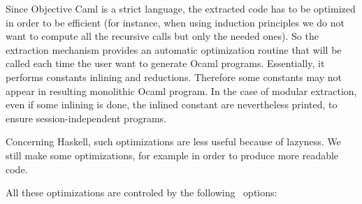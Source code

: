 
Since Objective Caml is a strict language, the extracted
code has to be optimized in order to be efficient (for instance, when
using induction principles we do not want to compute all the recursive
calls but only the needed ones). So the extraction mechanism provides
an automatic optimization routine that will be
called each time the user want to generate Ocaml programs. Essentially,
it performs constants inlining and reductions.  Therefore some
constants may not appear in resulting monolithic Ocaml program.
In the case of modular extraction, even if some inlining is done, the
inlined constant are nevertheless printed, to ensure
session-independent programs.

Concerning Haskell, such optimizations are less useful because of
lazyness. We still make some optimizations, for example in order to
produce more readable code. 

All these optimizations are controled by the following \Coq\ options: 

